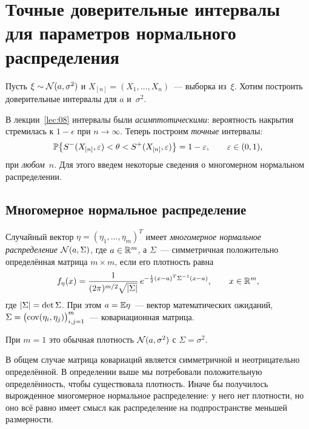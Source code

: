 \section[Точные доверительные интервалы для нормального распределения]%
  {Точные доверительные интервалы для параметров нормального распределения}
\label{lec:09}

Пусть $\xi \sim \Norm(a, \sigma^2)$ и $X_{[n]} = (X_1, \ldots, X_n)$~--- выборка из~$\xi$.
Хотим построить доверительные интервалы для $a$ и~$\sigma^2$.

В лекции~\ref{lec:08} интервалы были \emph{асимптотическими}: вероятность накрытия
стремилась к $1 - \epsilon$ при $n \to \infty$. Теперь построим \emph{точные} интервалы:
\[
  \P\bigl\{S^-(X_{[n]}, \epsilon) < \theta < S^+(X_{[n]}, \epsilon)\bigr\} = 1 - \epsilon,
  \qquad \epsilon \in (0, 1),
\]
при \emph{любом}~$n$. Для этого введем некоторые сведения о многомерном нормальном распределении.

\subsection{Многомерное нормальное распределение}
\label{lec09:mvn}

\begin{definition}
  Случайный вектор $\eta = (\eta_1, \ldots, \eta_m)^T$ имеет \emph{многомерное нормальное
  распределение} $\Norm(a, \Sigma)$, где $a \in \R^m$, а $\Sigma$~--- симметричная
  положительно определённая матрица $m \times m$, если его плотность равна
  \[
    f_\eta(x) = \frac{1}{(2\pi)^{m/2} \sqrt{\abs{\Sigma}}}\,
                e^{-\frac12 (x - a)^T \Sigma^{-1} (x - a)},
    \qquad x \in \R^m,
  \]
  где $\abs{\Sigma} = \det\Sigma$. При этом $a = \E\eta$~--- вектор математических ожиданий,
  $\Sigma = \bigl(\cov(\eta_i, \eta_j)\bigr)_{i, j = 1}^m$~--- ковариационная матрица.
\end{definition}

При $m = 1$ это обычная плотность $\Norm(a, \sigma^2)$ с $\Sigma = \sigma^2$.

\begin{remark}
  В общем случае матрица ковариаций является симметричной и неотрицательно определённой.
  В определении выше мы потребовали положительную определённость, чтобы существовала плотность.
  Иначе бы получилось вырожденное многомерное нормальное распределение: у него нет плотности, но
  оно всё равно имеет смысл как распределение на подпространстве меньшей размерности.
\end{remark}

